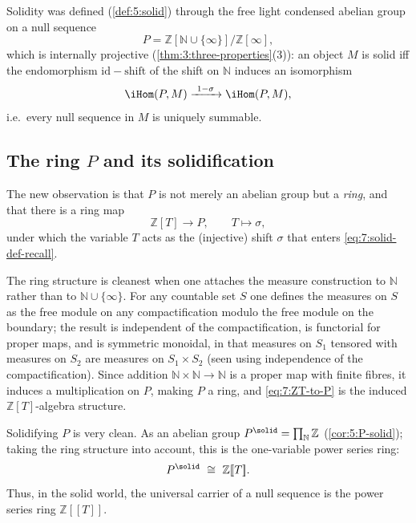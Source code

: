 Solidity was defined (\cref{def:5:solid}) through the free light condensed
abelian group on a null sequence
\begin{equation*}
P=\mathbb{Z}[\mathbb{N}\cup\{\infty\}]\big/\mathbb{Z}[\infty],
\end{equation*}
which is internally projective (\cref{thm:3:three-properties}(3)): an object
$M$ is solid iff the endomorphism $\mathrm{id}-\mathrm{shift}$ of the shift on
$\mathbb{N}$ induces an isomorphism
\begin{equation}
\label{eq:7:solid-def-recall}
\iHom(P,M)\xrightarrow{\ 1-\sigma\ }\iHom(P,M),
\end{equation}
i.e.\ every null sequence in $M$ is uniquely summable.

\subsection{The ring \texorpdfstring{$P$}{P} and its solidification}

The new observation is that $P$ is not merely an abelian group but a
\emph{ring}, and that there is a ring map
\begin{equation}
\label{eq:7:ZT-to-P}
\mathbb{Z}[T]\longrightarrow P,\qquad T\longmapsto\sigma,
\end{equation}
under which the variable $T$ acts as the (injective) shift $\sigma$ that
enters \eqref{eq:7:solid-def-recall}.

\begin{remark}
\label{rmk:7:P-ring}
The ring structure is cleanest when one attaches the measure construction to
$\mathbb{N}$ rather than to $\mathbb{N}\cup\{\infty\}$. For any countable set
$S$ one defines the measures on $S$ as the free module on any compactification
modulo the free module on the boundary; the result is independent of the
compactification, is functorial for proper maps, and is symmetric monoidal, in
that measures on $S_1$ tensored with measures on $S_2$ are measures on
$S_1\times S_2$ (seen using independence of the compactification). Since
addition $\mathbb{N}\times\mathbb{N}\to\mathbb{N}$ is a proper map with finite
fibres, it induces a multiplication on $P$, making $P$ a ring, and
\eqref{eq:7:ZT-to-P} is the induced $\mathbb{Z}[T]$-algebra structure.
\end{remark}

Solidifying $P$ is very clean. As an abelian group $P^{\solid}
=\prod_{\mathbb{N}}\mathbb{Z}$ (\cref{cor:5:P-solid}); taking the ring
structure into account, this is the one-variable power series ring:
\begin{equation*}
P^{\solid}\ \cong\ \mathbb{Z}[\![T]\!].
\end{equation*}
Thus, in the solid world, the universal carrier of a null sequence is the
power series ring $\mathbb{Z}[\![T]\!]$.

